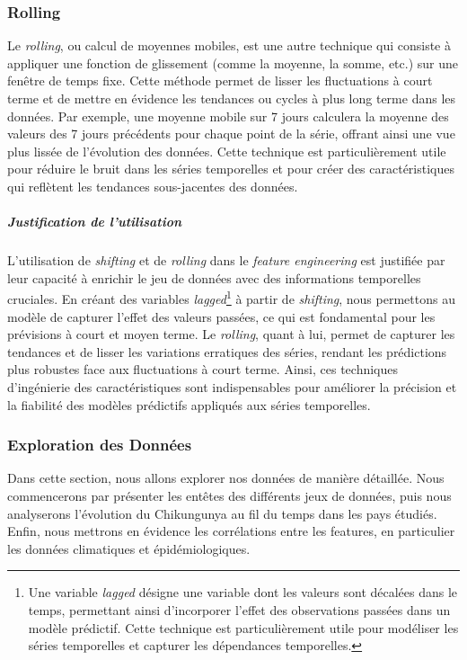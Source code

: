 \subsubsection*{Rolling}

Le \textit{rolling}, ou calcul de moyennes mobiles, est une autre technique qui consiste à appliquer une fonction de glissement (comme la moyenne, la somme, etc.) sur une fenêtre de temps fixe. Cette méthode permet de lisser les fluctuations à court terme et de mettre en évidence les tendances ou cycles à plus long terme dans les données. Par exemple, une moyenne mobile sur 7 jours calculera la moyenne des valeurs des 7 jours précédents pour chaque point de la série, offrant ainsi une vue plus lissée de l'évolution des données. Cette technique est particulièrement utile pour réduire le bruit dans les séries temporelles et pour créer des caractéristiques qui reflètent les tendances sous-jacentes des données.

\subparagraph{Justification de l'utilisation}

L'utilisation de \textit{shifting} et de \textit{rolling} dans le \textit{feature engineering} est justifiée par leur capacité à enrichir le jeu de données avec des informations temporelles cruciales. En créant des variables \textit{lagged}\footnote{Une variable \textit{lagged} désigne une variable dont les valeurs sont décalées dans le temps, permettant ainsi d'incorporer l'effet des observations passées dans un modèle prédictif. Cette technique est particulièrement utile pour modéliser les séries temporelles et capturer les dépendances temporelles.} à partir de \textit{shifting}, nous permettons au modèle de capturer l'effet des valeurs passées, ce qui est fondamental pour les prévisions à court et moyen terme. Le \textit{rolling}, quant à lui, permet de capturer les tendances et de lisser les variations erratiques des séries, rendant les prédictions plus robustes face aux fluctuations à court terme. Ainsi, ces techniques d'ingénierie des caractéristiques sont indispensables pour améliorer la précision et la fiabilité des modèles prédictifs appliqués aux séries temporelles.


\subsubsection{Exploration des Données}
Dans cette section, nous allons explorer nos données de manière détaillée. Nous commencerons par présenter les entêtes des différents jeux de données, puis nous analyserons l'évolution du Chikungunya au fil du temps dans les pays étudiés. Enfin, nous mettrons en évidence les corrélations entre les features, en particulier les données climatiques et épidémiologiques.

